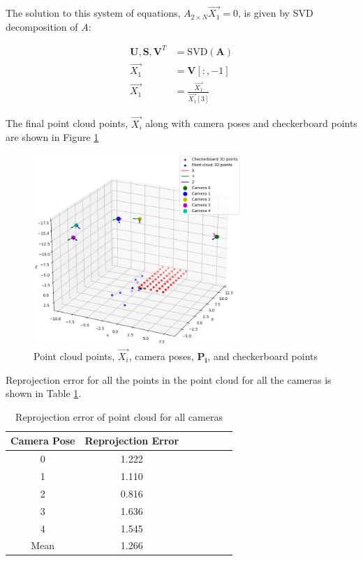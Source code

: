 \documentclass{article}
\begin{document}
The solution to this system of equations, $A_{2 \times N} \vec{X_1} = 0$, is given by SVD decomposition of $A$:


\begin{align}
    \mathbf{U}, \mathbf{S}, \mathbf{V}^T &= \mathrm{SVD}(\mathbf{A}) \\
    \vec{X_1} &= \mathbf{V}[:, -1] \\
    \vec{X_1} &= \frac{\vec{X_1}}{\vec{X_1}[3]}
\end{align}

The final point cloud points, $\vec{X_i}$ along with camera poses and checkerboard points are shown in Figure \ref{fig:env_cam_frame_point_cloud}

\begin{figure}[h]
    \centering
    \includegraphics[width=0.7\textwidth]{images/env_cam_frame_point_cloud.png}
    \caption{Point cloud points, $\vec{X_i}$, camera poses, $\mathbf{P_i}$, and checkerboard points}
    \label{fig:env_cam_frame_point_cloud}
\end{figure}

Reprojection error for all the points in the point cloud for all the cameras is shown in Table \ref{tab:reprojection_error_point_cloud}.

\begin{table}[h]
    \centering
    \begin{tabular}{|c|c|c|c|c|c|c|}
        \hline
        Camera Pose & Reprojection Error \\
        \hline
        0 & 1.222 \\
        1 & 1.110 \\
        2 & 0.816 \\
        3 & 1.636 \\
        4 & 1.545 \\
        Mean & 1.266 \\
        \hline
    \end{tabular}
    \caption{Reprojection error of point cloud for all cameras}
    \label{tab:reprojection_error_point_cloud}
\end{table}
\end{document}
